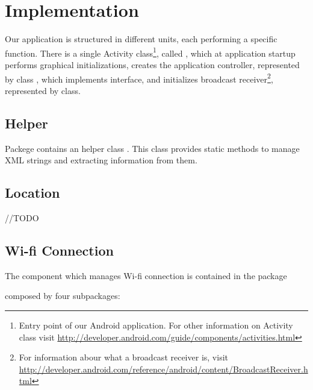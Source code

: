 \section{Implementation}
\label{sec:implementation}

Our application is structured in different units, each performing a specific function. There is a single Activity class\footnote{Entry point of our Android application. For other information on Activity class visit \url{http://developer.android.com/guide/components/activities.html}}, called , which at application startup performs graphical initializations, creates the application controller, represented by class , which implements  interface, and initializes broadcast receiver\footnote{For information abour what a broadcast receiver is, visit \url{http://developer.android.com/reference/android/content/BroadcastReceiver.html}}, represented by  class.

\subsection{Helper}
Packege  contains an helper class . This class provides static methods to manage XML strings and extracting information from them.

\subsection{Location}

//TODO

\subsection{Wi-fi Connection}
The component which manages Wi-fi connection is contained in the package \begin{center}\end{center} composed by four subpackages:
	\\
